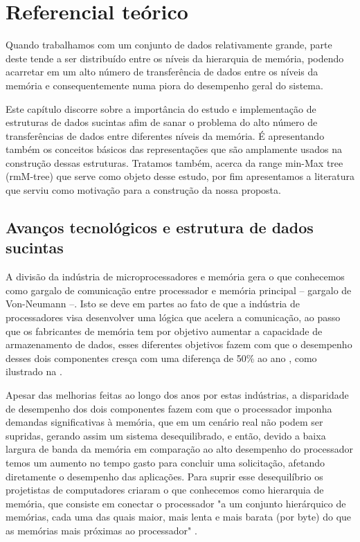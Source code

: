 \chapter{Referencial teórico}\label{ch:fundamentacao}

Quando trabalhamos com um conjunto de dados relativamente grande, parte deste tende a ser distribuído entre os níveis da hierarquia de memória, podendo acarretar em um alto número de transferência de dados entre os níveis da memória e consequentemente numa piora do desempenho geral do sistema. 

Este capítulo discorre sobre a importância do estudo e implementação de estruturas de dados sucintas afim de sanar o problema do alto número de transferências de dados entre diferentes níveis da memória. É apresentando também os conceitos básicos das representações que são amplamente usados na construção dessas estruturas. Tratamos também, acerca da range min-Max tree (rmM-tree) que serve como objeto desse estudo, por fim apresentamos a literatura que serviu como motivação para a construção da nossa proposta. 

\section{Avanços tecnológicos e estrutura de dados sucintas}
A divisão da indústria de microprocessadores e memória gera o que conhecemos como  gargalo de comunicação entre processador e  memória principal -- gargalo de Von-Neumann --. Isto se deve em partes ao fato de que a indústria de processadores visa desenvolver uma lógica que acelera a comunicação, ao passo que os fabricantes de memória tem por objetivo aumentar a capacidade de armazenamento de dados, esses diferentes objetivos fazem com que o desempenho desses dois componentes cresça com uma diferença de 50\%  ao ano \citep{paper-processor-memory-bottleneck,paper-gap-between-processor-memory}, como ilustrado na .

Apesar das melhorias feitas ao longo dos anos por estas indústrias, a disparidade de desempenho dos dois componentes fazem com que o processador imponha demandas significativas à memória, que em um cenário real não podem ser supridas, gerando assim um sistema desequilibrado, e então, devido a baixa largura de banda da memória em comparação ao alto desempenho do processador temos um aumento no tempo gasto para concluir uma solicitação, afetando diretamente o desempenho das aplicações. Para suprir esse desequilíbrio os projetistas de computadores criaram o que conhecemos como hierarquia de memória, que consiste em conectar o processador  "a um conjunto hierárquico de memórias, cada uma das quais maior, mais lenta e mais barata (por byte) do que as memórias mais próximas ao processador" \cite[tradução nossa]{paper-gap-between-processor-memory}.

